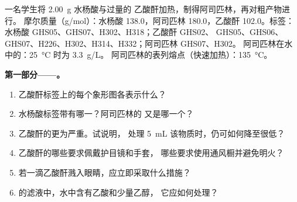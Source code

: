 \begin{problem}
\label{pb:b1:lab-techniques-1:1}
一名学生将 \qty{2.00}{g} 水杨酸与过量的
乙酸酐加热，制得阿司匹林，再对粗产物进行。
摩尔质量（\unit{g/mol}）：水杨酸  138.0，阿司匹林
 180.0，乙酸酐  102.0。标签：
水杨酸 GHS05、GHS07、H302、H318；乙酸酐 GHS02、
GHS05、GHS06、GHS07、H226、H302、H314、H332；阿司匹林 GHS07、H302。
阿司匹林在水中的：\qty{25}{\celsius} 时为 \qty{3.3}{g/L}。
阿司匹林的表列熔点（快速加热）：\qty{135}{\celsius}。

\medskip
\noindent\textbf{第一部分——。}
\begin{enumerate}
  \item 乙酸酐标签上的每个象形图各表示什么？
  \item 水杨酸标签带有哪一？阿司匹林的
        又是哪一个？
  \item 乙酸酐的更为严重。试说明，
        处理 \qty{5}{mL} 该物质时，仍可如何降至很低？
  \item 乙酸酐的哪些要求佩戴护目镜和手套，
        哪些要求使用通风橱并避免明火？
  \item 若一滴乙酸酐溅入眼睛，应立即采取什么措施？
  \item {}的滤液中，水中含有乙酸和少量乙醇，
        它应如何处理？
\end{enumerate}


\end{problem}
